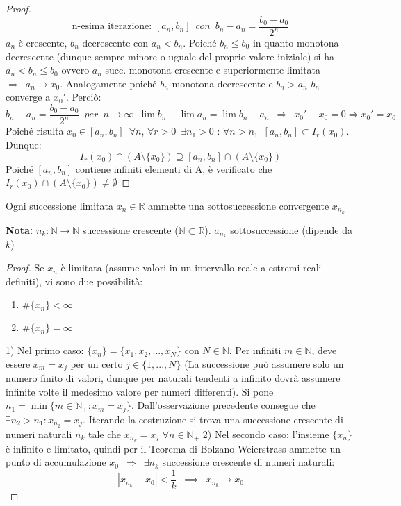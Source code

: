 \documentclass[10pt]{article}
\theoremstyle{plain}
\begin{document}
\begin{proof}
\[\textrm{n-esima iterazione: } [a_n, b_n] \enspace con \enspace b_n - a_n = \frac{b_0 - a_0}{2^n}\]
$a_n$ è crescente, $b_n$ decrescente con $a_n < b_n$. Poiché $b_n \leq b_0$ in quanto monotona decrescente (dunque sempre minore o uguale del proprio valore iniziale) si ha $a_n < b_n \leq b_0$ ovvero $a_n$ succ. monotona crescente e superiormente limitata $\Rightarrow \enspace a_n \longrightarrow x_0$. Analogamente poiché $b_n$ monotona decrescente e $b_n > a_n$ $b_n$ converge a $x_0'$. Perciò:
\[b_n - a_n = \frac{b_0 - a_0}{2^n} \enspace per \enspace n \rightarrow \infty \enspace \lim b_n - \lim a_n = \lim b_n - a_n \enspace \Rightarrow \enspace x_0' - x_0 = 0 \Rightarrow x_0' = x_0\]
Poiché risulta $x_0 \in [a_n, b_n] \enspace \forall n$, $\forall r > 0 \enspace \exists n_1 > 0$ : $\forall n > n_1 \enspace [a_n, b_n] \subset I_r(x_0)$. Dunque:
\[I_r(x_0) \cap (A \setminus \{x_0\}) \supseteq [a_n, b_n] \cap (A \setminus \{x_0\})\]
Poiché $[a_n, b_n]$ contiene infiniti elementi di A, è verificato che $I_r(x_0) \cap (A \setminus \{x_0\}) \neq \emptyset$
\end{proof}
\hypertarget{corollaier}{
\begin{cor}
Ogni successione limitata $x_n \in \mathbb{R}$ ammette una sottosuccessione convergente $x_{n_k}$
\end{cor}}
\textbf{Nota: } $n_k : \mathbb{N} \longrightarrow \mathbb{N}$ successione crescente ($\mathbb{N} \subset \mathbb{R}$). $a_{n_k}$ sottosuccessione (dipende da $k$)
\begin{proof}
    Se $x_n$ è limitata (assume valori in un intervallo reale a estremi reali definiti), vi sono due possibilità:
    \begin{enumerate}
    \item $\#\{x_n\} < \infty$
    \item $\#\{x_n\} = \infty$
    \end{enumerate}
    1) Nel primo caso: $\{x_n\} = \{x_1, x_2, ... , x_N\}$ con $N \in \mathbb{N}$. Per infiniti $m \in \mathbb{N}$, deve essere $x_m = x_j$ per un certo $j \in \{1, ..., N\}$ (La successione può assumere solo un numero finito di valori, dunque per naturali tendenti a infinito dovrà assumere infinite volte il medesimo valore per numeri differenti). \newline Si pone $n_1 = \min \{m \in \mathbb{N}_+ : x_m = x_j\}$. Dall'osservazione precedente consegue che $\exists n_2 > n_1 : x_{n_2} = x_j$. \newline Iterando la costruzione si trova una successione crescente di numeri naturali $n_k$ tale che $x_{n_k} = x_j$ $\forall n \in \mathbb{N}_+$
    2) Nel secondo caso: l'insieme $\{x_n\}$ è infinito e limitato, quindi per il Teorema di Bolzano-Weierstrass ammette un punto di accumulazione $x_0 \enspace \Rightarrow \enspace \exists n_k$ successione crescente di numeri naturali:
    \[|x_{n_k} - x_0| < \frac{1}{k} \enspace \implies \enspace x_{n_k} \rightarrow x_0\]
\end{proof}
\end{document}
